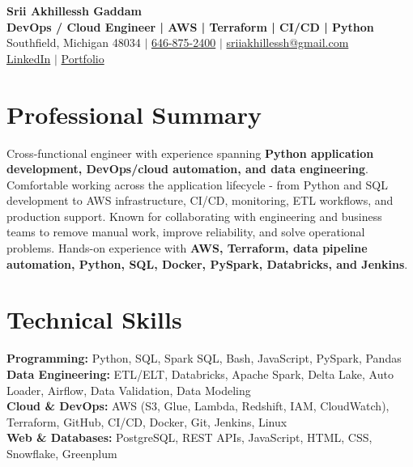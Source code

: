 \documentclass[letterpaper,10pt]{article}
\begin{document}
\fontsize{9.35pt}{10.45pt}\selectfont

\begin{center}
    {\LARGE \textbf{Srii Akhillessh Gaddam}} \\[-1pt]
    \textbf{DevOps / Cloud Engineer | AWS | Terraform | CI/CD | Python} \\[2pt]
    Southfield, Michigan 48034 $|$
    \href{tel:6468752400}{646-875-2400} $|$
    \href{mailto:sriiakhillessh@gmail.com}{sriiakhillessh@gmail.com} \\[1pt]
    \href{https://www.linkedin.com/in/srii-akhiilessh-gaddam-b48668191/}{LinkedIn} $|$
    \href{https://sriiakhillesshg.github.io/portfolio/}{Portfolio}
\end{center}
\vspace{-8pt}

\section{Professional Summary}
\small{Cross-functional engineer with experience spanning \textbf{Python application development, DevOps/cloud automation, and data engineering}. Comfortable working across the application lifecycle - from Python and SQL development to AWS infrastructure, CI/CD, monitoring, ETL workflows, and production support. Known for collaborating with engineering and business teams to remove manual work, improve reliability, and solve operational problems. Hands-on experience with \textbf{AWS, Terraform, data pipeline automation, Python, SQL, Docker, PySpark, Databricks, and Jenkins}.}

\section{Technical Skills}
\small{
\textbf{Programming:} Python, SQL, Spark SQL, Bash, JavaScript, PySpark, Pandas \\
\textbf{Data Engineering:} ETL/ELT, Databricks, Apache Spark, Delta Lake, Auto Loader, Airflow, Data Validation, Data Modeling \\
\textbf{Cloud \& DevOps:} AWS (S3, Glue, Lambda, Redshift, IAM, CloudWatch), Terraform, GitHub, CI/CD, Docker, Git, Jenkins, Linux \\
\textbf{Web \& Databases:} PostgreSQL, REST APIs, JavaScript, HTML, CSS, Snowflake, Greenplum
}
\end{document}

